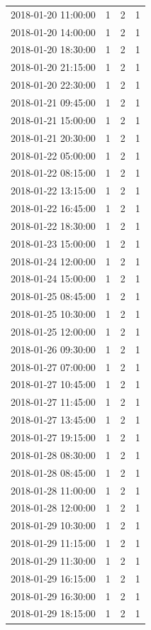 \begin{tabular}{lrrr}
2018-01-20 11:00:00 & 1 & 2 & 1 \\
2018-01-20 14:00:00 & 1 & 2 & 1 \\
2018-01-20 18:30:00 & 1 & 2 & 1 \\
2018-01-20 21:15:00 & 1 & 2 & 1 \\
2018-01-20 22:30:00 & 1 & 2 & 1 \\
2018-01-21 09:45:00 & 1 & 2 & 1 \\
2018-01-21 15:00:00 & 1 & 2 & 1 \\
2018-01-21 20:30:00 & 1 & 2 & 1 \\
2018-01-22 05:00:00 & 1 & 2 & 1 \\
2018-01-22 08:15:00 & 1 & 2 & 1 \\
2018-01-22 13:15:00 & 1 & 2 & 1 \\
2018-01-22 16:45:00 & 1 & 2 & 1 \\
2018-01-22 18:30:00 & 1 & 2 & 1 \\
2018-01-23 15:00:00 & 1 & 2 & 1 \\
2018-01-24 12:00:00 & 1 & 2 & 1 \\
2018-01-24 15:00:00 & 1 & 2 & 1 \\
2018-01-25 08:45:00 & 1 & 2 & 1 \\
2018-01-25 10:30:00 & 1 & 2 & 1 \\
2018-01-25 12:00:00 & 1 & 2 & 1 \\
2018-01-26 09:30:00 & 1 & 2 & 1 \\
2018-01-27 07:00:00 & 1 & 2 & 1 \\
2018-01-27 10:45:00 & 1 & 2 & 1 \\
2018-01-27 11:45:00 & 1 & 2 & 1 \\
2018-01-27 13:45:00 & 1 & 2 & 1 \\
2018-01-27 19:15:00 & 1 & 2 & 1 \\
2018-01-28 08:30:00 & 1 & 2 & 1 \\
2018-01-28 08:45:00 & 1 & 2 & 1 \\
2018-01-28 11:00:00 & 1 & 2 & 1 \\
2018-01-28 12:00:00 & 1 & 2 & 1 \\
2018-01-29 10:30:00 & 1 & 2 & 1 \\
2018-01-29 11:15:00 & 1 & 2 & 1 \\
2018-01-29 11:30:00 & 1 & 2 & 1 \\
2018-01-29 16:15:00 & 1 & 2 & 1 \\
2018-01-29 16:30:00 & 1 & 2 & 1 \\
2018-01-29 18:15:00 & 1 & 2 & 1 \\

\end{tabular}
